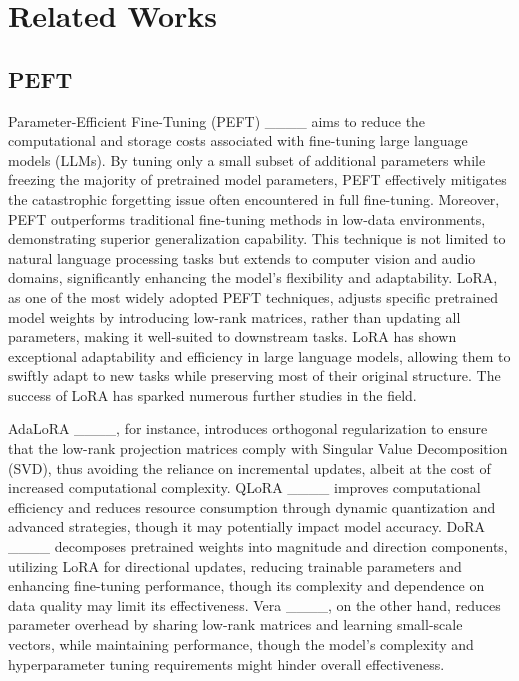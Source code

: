 \section{Related Works}
\subsection{PEFT}
Parameter-Efficient Fine-Tuning (PEFT) ____ aims to reduce the computational and storage costs associated with fine-tuning large language models (LLMs). By tuning only a small subset of additional parameters while freezing the majority of pretrained model parameters, PEFT effectively mitigates the catastrophic forgetting issue often encountered in full fine-tuning. Moreover, PEFT outperforms traditional fine-tuning methods in low-data environments, demonstrating superior generalization capability. This technique is not limited to natural language processing tasks but extends to computer vision and audio domains, significantly enhancing the model's flexibility and adaptability. LoRA, as one of the most widely adopted PEFT techniques, adjusts specific pretrained model weights by introducing low-rank matrices, rather than updating all parameters, making it well-suited to downstream tasks. LoRA has shown exceptional adaptability and efficiency in large language models, allowing them to swiftly adapt to new tasks while preserving most of their original structure. The success of LoRA has sparked numerous further studies in the field.

AdaLoRA ____, for instance, introduces orthogonal regularization to ensure that the low-rank projection matrices comply with Singular Value Decomposition (SVD), thus avoiding the reliance on incremental updates, albeit at the cost of increased computational complexity. QLoRA ____ improves computational efficiency and reduces resource consumption through dynamic quantization and advanced strategies, though it may potentially impact model accuracy. DoRA ____ decomposes pretrained weights into magnitude and direction components, utilizing LoRA for directional updates, reducing trainable parameters and enhancing fine-tuning performance, though its complexity and dependence on data quality may limit its effectiveness. Vera ____, on the other hand, reduces parameter overhead by sharing low-rank matrices and learning small-scale vectors, while maintaining performance, though the model's complexity and hyperparameter tuning requirements might hinder overall effectiveness.

